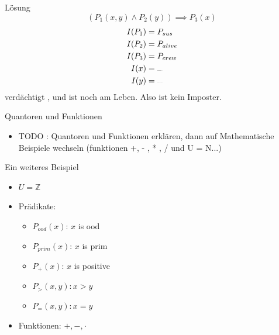 {\begin{frame}{Lösung}
    $$(P_1(x,y) \wedge P_2(y)) \implies P_3(x)$$
        \begin{align*}
            I(P_1) &= P_{sus}\\
            I(P_2) &= P_{alive}\\
            I(P_3) &= P_{crew}\\
            I(x) &= \sus{white}\\
            I(y) &= \sus{magenta}
        \end{align*}
         verdächtigt , und  ist noch am Leben. Also ist  kein Imposter.
\end{frame}
}



\begin{frame}{Quantoren und Funktionen}
    \begin{itemize}
        \item TODO : Quantoren und Funktionen erklären, dann auf Mathematische Beispiele wechseln (funktionen +, - , * , / und U = N...)
    \end{itemize}
\end{frame}

\begin{frame}{Ein weiteres Beispiel}
    \begin{itemize}
        \item $U = \mathbb Z$
        \item Prädikate:
        \begin{itemize}
            \item $P_{ood}(x)$: $x$ is ood
            \item $P_{prim}(x)$: $x$ is prim
            \item $P_{+}(x)$: $x$ is positive
            \item $P_>(x,y): x>y$ 
            \item $P_=(x,y): x=y$ 
        \end{itemize}
        \item Funktionen: $+, -, \cdot$ 
    \end{itemize}
\end{frame}


